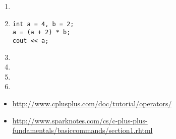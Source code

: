 \begin{enumerate}
\item {}

\item

\noindent\begin{minipage}{\linewidth}\begin{lstlisting}
int a = 4, b = 2;
a = (a + 2) * b;
cout << a;
\end{lstlisting}\end{minipage}

\item 
\noindent{}

\noindent{}

\noindent{}


\item
\noindent{}

\noindent{}

\noindent{}

\item
\noindent{}

\noindent{}

\noindent{}

\noindent{}


\item
\noindent{}

\noindent{}

\noindent{}

\noindent{}


\end{enumerate}

\begin{itemize}
\item \url{http://www.cplusplus.com/doc/tutorial/operators/}
\item \url{http://www.sparknotes.com/cs/c-plus-plus-fundamentals/basiccommands/section1.rhtml}
\end{itemize}